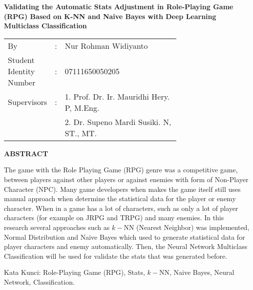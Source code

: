 \begin{spacing}{1}
	\begin{center}
		\Large\textbf{Validating the Automatic Stats Adjustment in Role-Playing Game (RPG) Based on K-NN and Naive Bayes with Deep Learning Multiclass Classification}
	\end{center}
	\vspace{2ex}
	
	\begin{adjustwidth}{-0.2cm}{}
		\begin{tabular}{lcp{0.7\linewidth}}
			By &:& Nur Rohman Widiyanto \\
			Student Identity Number &:&	07111650050205 \\
			Supervisors &:& 1. Prof. Dr. Ir. Mauridhi Hery. P, M.Eng. \\
			& & 2. Dr. Supeno Mardi Susiki. N, ST., MT. \\
		\end{tabular}
	\end{adjustwidth}
	\vspace{2ex}
	
	\begin{center}
		\Large\textbf{ABSTRACT}
	\end{center}
	\vspace{1ex}
	
	The game with the Role Playing Game (RPG) genre was a competitive game, between players against other players or against enemies with form of Non-Player Character (NPC). Many game developers when makes the game itself still uses manual approach when determine the statistical data for the player or enemy character. When in a game has a lot of characters, such as only a lot of player characters (for example on JRPG and TRPG) and many enemies. In this research several approaches such as $k-$NN (Nearest Neighbor) was implemented, Normal Distribution and Naive Bayes which used to generate statistical data for player characters and enemy automatically. Then, the Neural Network Multiclass Classification will be used for validate the stats that was generated before.
	\vspace{2ex}

	Kata Kunci: Role-Playing Game (RPG), Stats, $k-$NN, Naive Bayes, Neural Network, Classification.
\end{spacing}